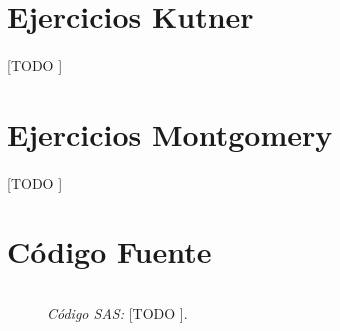 \documentclass[11pt]{article}
\begin{document}
  \maketitle


  \section{Ejercicios Kutner}

    \paragraph{}
    [TODO ]

  \section{Ejercicios Montgomery}

    \paragraph{}
    [TODO ]


  \section{Código Fuente}

    \begin{figure}[!h]
      \centering
      \begin{verbatim}

      \end{verbatim}
      \caption{\emph{Código SAS:} [TODO ].}
      \label{code:sas_1}
    \end{figure}

  \nocite{rano2017}
  \nocite{sas}
  \nocite{neter1996applied}
  \nocite{montgomery2012introduction}

  
  
\end{document}
